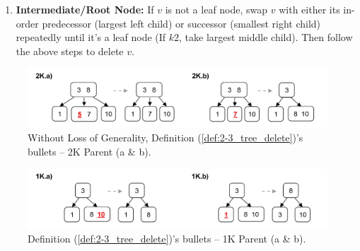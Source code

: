 \begin{Def}
\begin{enumerate}
\begin{itemize}
        \end{itemize}
        \item \textbf{Intermediate/Root Node:} If $v$ is not a leaf node,
        swap $v$ with either its in-order predecessor (largest left child) or successor (smallest right child)
        repeatedly until it's a leaf node (If $k2$, take largest middle child). Then follow the above steps to delete $v$.
    \end{enumerate}
        
\end{Def}

\begin{figure}[ht!] 
    \begin{center}
    \includegraphics[width=\textwidth]{./Sections/graphs/search/2_3_delete.png}
    \end{center}
     \caption{Without Loss of Generality, Definition (\ref{def:2-3_tree_delete})'s bullets -- 2K Parent (a \& b).}
    
     \label{fig:2-3_tree_delete}
\end{figure}

\newpage

\begin{figure}[ht!] 
    \begin{center}
    \includegraphics[width=\textwidth]{./Sections/graphs/search/2_3_delete_2.png}
    \end{center}

    \vspace{-1em}
     \caption{Definition (\ref{def:2-3_tree_delete})'s bullets -- 1K Parent (a \& b).}\label{fig:2-3_tree_delete_2}
\end{figure}

